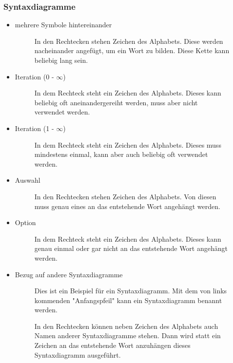 \documentclass{article}
\begin{document}
	\subsubsection{Syntaxdiagramme}
	
	\begin{itemize}
		\item mehrere Symbole hintereinander
		\begin{figure}[H]
			\centering
			
			\caption{In den Rechtecken stehen Zeichen des Alphabets. Diese werden nacheinander angefügt, um ein Wort zu bilden. Diese Kette kann beliebig lang sein.}
		\end{figure}	
		\item Iteration (0 - $\infty$)
		\begin{figure}[H]
			\centering
			
			\caption{In dem Rechteck steht ein Zeichen des Alphabets. Dieses kann beliebig oft aneinandergereiht werden, muss aber nicht verwendet werden.}
		\end{figure}	
		\item Iteration (1 - $\infty$)
		\begin{figure}[H]
			\centering
			
			\caption{In dem Rechteck steht ein Zeichen des Alphabets. Dieses muss mindestens einmal, kann aber auch beliebig oft verwendet werden.}
		\end{figure}	
		\item Auswahl
		\begin{figure}[H]
			\centering
			
			\caption{In den Rechtecken stehen Zeichen des Alphabets. Von diesen muss genau eines an das entstehende Wort angehängt werden.}
		\end{figure}	
		\item Option
		\begin{figure}[H]
			\centering
			
			\caption{In dem Rechteck steht ein Zeichen des Alphabets. Dieses kann genau einmal oder gar nicht an das entstehende Wort angehängt werden.}
		\end{figure}	
		\item Bezug auf andere Syntaxdiagramme
		\begin{figure}[H]
			\centering
			
			\caption{Dies ist ein Beispiel für ein Syntaxdiagramm. Mit dem von links kommenden "Anfangspfeil" kann ein Syntaxdiagramm benannt werden.}
		\end{figure}	
		\begin{figure}[H]
			\centering
			
			\caption{In den Rechtecken können neben Zeichen des Alphabets auch Namen anderer Syntaxdiagramme stehen. Dann wird statt ein Zeichen an das entstehende Wort anzuhängen dieses Syntaxdiagramm ausgeführt.}
		\end{figure}	
	\end{itemize}
	
\end{document}
